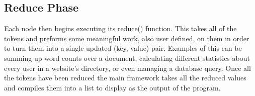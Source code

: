 \documentclass[report]{IEEEtran}
\begin{document}
\subsection{Reduce Phase}
Each node then begins executing its reduce() function. This takes all of the tokens and preforms some meaningful work, also user defined, on them in order to turn them into a single updated (key, value) pair. Examples of this can be summing up word counts over a document, calculating different statistics about every user in a website's directory, or even managing a database query. Once all the tokens have been reduced the main framework takes all the reduced values and compiles them into a list to display as the output of the program.

%
%



%
%
\end{document}
